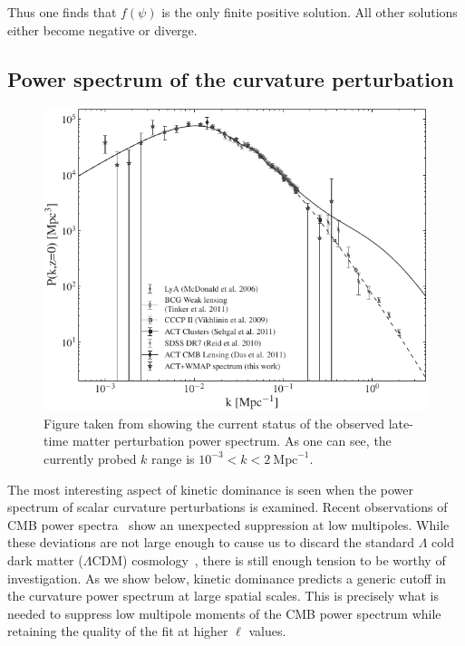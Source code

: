 Thus one finds that \(f(\psi)\) is the only finite positive solution.  All other solutions either become negative or diverge.




\subsection{Power spectrum of the curvature perturbation}
\label{sec:powspec}
%
\begin{figure}[tp]
  \centering
  \includegraphics[width=\textwidth]{chapters/kinetic_dominance/figures/powerspec}
  \caption{Figure taken from \protect\cite{hlozek_atacama_2012} showing the current status of the observed late-time matter perturbation power spectrum. As one can see, the currently probed \(k\) range is \(10^{-3}<k<2\:\mathrm{Mpc}^{-1}\).}\label{fig:experimental_power_spectrum}
\end{figure}
%

The most interesting aspect of kinetic dominance is seen when the power spectrum of scalar curvature perturbations is examined. Recent observations of CMB power spectra~\citep{hinshaw_nine-year_2012,planck_collaboration_planck_2013} show an unexpected suppression at low multipoles. While these deviations are not large enough to cause us to discard the standard \(\Lambda\) cold dark matter (\(\Lambda\)CDM) cosmology~\citep{1998PhRvD..57.2207B,2000PhRvD..62l3513B,2004PhRvD..69f3516D}, there is still enough tension to be worthy of investigation.  As we show below, kinetic dominance predicts a generic cutoff in the curvature power spectrum at large spatial scales. This is precisely what is needed to suppress low multipole moments of the CMB power spectrum while retaining the quality of the fit at higher \(\ell\) values.


